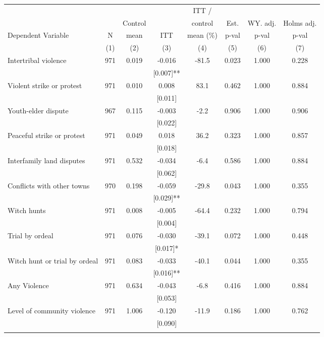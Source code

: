 \begin{tabular}{lccccccc}
\hline \noalign{\smallskip} &  &  &  & ITT / &  &  & \\
 &  & Control &  & control & Est. & WY. adj. & Holms adj.\\
Dependent Variable & N & mean & ITT & mean (\%) & p-val & p-val & p-val\\
 & (1) & (2) & (3) & (4) & (5) & (6) & (7)\\
\noalign{\smallskip}\hline \noalign{\smallskip}\quad Intertribal violence & 971 & 0.019 & -0.016 & -81.5 & 0.023 & 1.000 & 0.228\\
 &  &  & [0.007]** &  &  &  & \\
\quad Violent strike or protest & 971 & 0.010 & 0.008 & 83.1 & 0.462 & 1.000 & 0.884\\
 &  &  & [0.011] &  &  &  & \\
\quad Youth-elder dispute & 967 & 0.115 & -0.003 & -2.2 & 0.906 & 1.000 & 0.906\\
 &  &  & [0.022] &  &  &  & \\
\quad Peaceful strike or protest & 971 & 0.049 & 0.018 & 36.2 & 0.323 & 1.000 & 0.857\\
 &  &  & [0.018] &  &  &  & \\
\quad Interfamily land disputes & 971 & 0.532 & -0.034 & -6.4 & 0.586 & 1.000 & 0.884\\
 &  &  & [0.062] &  &  &  & \\
\quad Conflicts with other towns & 970 & 0.198 & -0.059 & -29.8 & 0.043 & 1.000 & 0.355\\
 &  &  & [0.029]** &  &  &  & \\
\quad Witch hunts & 971 & 0.008 & -0.005 & -64.4 & 0.232 & 1.000 & 0.794\\
 &  &  & [0.004] &  &  &  & \\
\quad Trial by ordeal & 971 & 0.076 & -0.030 & -39.1 & 0.072 & 1.000 & 0.448\\
 &  &  & [0.017]* &  &  &  & \\
\quad Witch hunt or trial by ordeal & 971 & 0.083 & -0.033 & -40.1 & 0.044 & 1.000 & 0.355\\
 &  &  & [0.016]** &  &  &  & \\
Any Violence & 971 & 0.634 & -0.043 & -6.8 & 0.416 & 1.000 & 0.884\\
 &  &  & [0.053] &  &  &  & \\
Level of community violence & 971 & 1.006 & -0.120 & -11.9 & 0.186 & 1.000 & 0.762\\
 &  &  & [0.090] &  &  &  & \\
\noalign{\smallskip}\hline\end{tabular}
